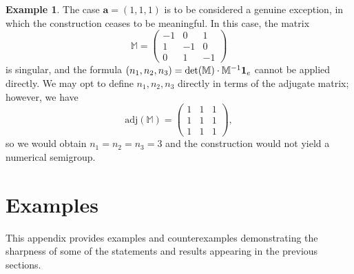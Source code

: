 \documentclass[11pt,twoside]{amsart}
\def\ba{{\mathbf a}}
\def\bbM{{\mathbb M}}
\theoremstyle{definition}
\newtheorem{ex}[Theorem]{Example}
\numberwithin{equation}{section}
\begin{document}
\begin{ex}\label{ExException111}
The case $\ba= (1,1,1) $ is to be considered a genuine exception, in which the construction ceases to be meaningful.
In this case, the matrix
$$
\bbM = \begin{pmatrix}
    -1 & 0 & 1 \\ 1 & -1 & 0 \\ 0 & 1 &-1
\end{pmatrix}
$$
is singular, and the formula $(n_1, n_2, n_3) = \det(\bbM) \cdot \bbM^{-1}{\bf 1}_e $ cannot be applied directly. 
We may opt to define $n_1, n_2, n_3$ directly in terms of the adjugate matrix; however, we have
$$
\mathrm{adj}(\bbM) = \begin{pmatrix}
    1 & 1 & 1 \\ 1 & 1 & 1 \\ 1 & 1 & 1
\end{pmatrix},
$$
so we would obtain $n_1=n_2=n_3=3$ and the construction would not yield a numerical semigroup.
\end{ex}

\appendix

\section{Examples}
    This appendix provides examples and counterexamples demonstrating the  sharpness of some of the statements and results appearing in the previous sections.
\end{document}

